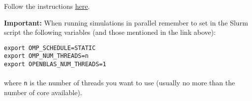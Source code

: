 \documentclass[12pt]{article}
\begin{document}
Follow the instructions \href{https://docs.computecanada.ca/wiki/Running_jobs}{\underline{here}}.

\textbf{Important:} When running simulations in parallel remember to set in the Slurm script the following variables (and those mentioned in the link above):
\begin{tcolorbox}
\texttt{export OMP\_SCHEDULE=STATIC} \\
\texttt{export OMP\_NUM\_THREADS=n} \\
\texttt{export OPENBLAS\_NUM\_THREADS=1} \\
\\
{where \texttt{n} is the number of threads you want to use (usually no more than the number of core available).}
\end{tcolorbox}
\end{document}
